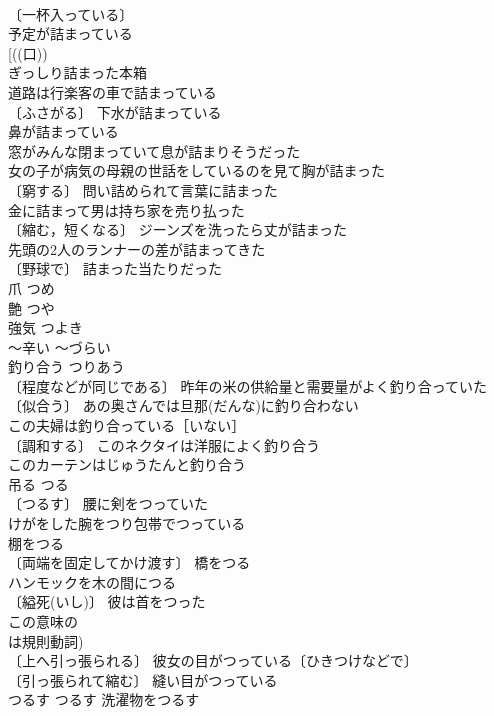 \documentclass[8pt]{extreport}
\begin{document}
\begin{CJK}{UTF8}{min}
\\	〔一杯入っている〕
\\	予定が詰まっている 
\\	[((口))
\\	ぎっしり詰まった本箱 
\\	道路は行楽客の車で詰まっている 
\\	〔ふさがる〕 下水が詰まっている 
\\	鼻が詰まっている 
\\	窓がみんな閉まっていて息が詰まりそうだった 
\\	女の子が病気の母親の世話をしているのを見て胸が詰まった 
\\	〔窮する〕 問い詰められて言葉に詰まった 
\\	金に詰まって男は持ち家を売り払った 
\\	〔縮む，短くなる〕 ジーンズを洗ったら丈が詰まった 
\\	先頭の2人のランナーの差が詰まってきた 
\\	〔野球で〕 詰まった当たりだった 
\\	爪	つめ	
\\	艶	つや	
\\	強気	つよき	
\\	～辛い	～づらい	
\\	釣り合う	つりあう	
\\	〔程度などが同じである〕 昨年の米の供給量と需要量がよく釣り合っていた 
\\	〔似合う〕 あの奥さんでは旦那(だんな)に釣り合わない 
\\	この夫婦は釣り合っている［いない］ 
\\	〔調和する〕 このネクタイは洋服によく釣り合う 
\\	このカーテンはじゅうたんと釣り合う 
\\	吊る	つる	
\\	〔つるす〕 腰に剣をつっていた 
\\	けがをした腕をつり包帯でつっている 
\\	棚をつる 
\\	〔両端を固定してかけ渡す〕 橋をつる 
\\	ハンモックを木の間につる 
\\	〔縊死(いし)〕 彼は首をつった 
\\	この意味の
\\	は規則動詞) 
\\	〔上へ引っ張られる〕 彼女の目がつっている〔ひきつけなどで〕 
\\	〔引っ張られて縮む〕 縫い目がつっている 
\\	つるす	つるす	洗濯物をつるす 

\end{CJK}
\end{document}
